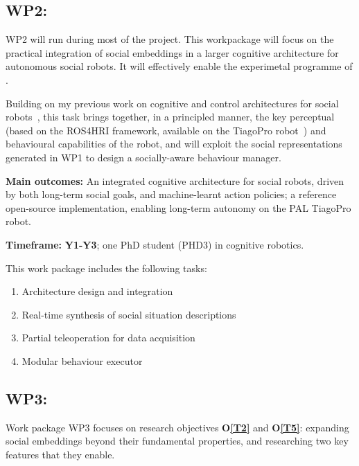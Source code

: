 \subsection{WP2: \textbf{\wpTwo}}

WP2 will run during most of the project. This workpackage will focus on the
practical integration of social embeddings in a larger cognitive architecture
for autonomous social robots. It will effectively enable the experimetal
programme of \project.

Building on my previous work on cognitive and control architectures for social
robots~\cite{lemaignan2017artificial,lemaignan2015pyrobots,baxter2016cognitive,lemaignan2014challenges,lemaignan2011what},
this task brings together, in a principled manner, the key perceptual (based on
the ROS4HRI framework, available on the TiagoPro robot~\cite{ros2023ros4hri})
and behavioural capabilities of the robot, and will exploit the social
representations generated in WP1 to design a socially-aware behaviour manager.


\begin{oframed}
    \textbf{Main outcomes:} An integrated cognitive architecture for social
    robots, driven by both long-term social goals, and machine-learnt action
    policies; a reference open-source implementation, enabling long-term
    autonomy on the PAL TiagoPro robot.

    \textbf{Timeframe:} \textbf{Y1-Y3}; one PhD student (PHD3) in cognitive
    robotics.

\end{oframed}

This work package includes the following tasks:

\begin{enumerate}[label=\textbf{T1.\arabic*}]
    \item{Architecture design and integration}
    \item{Real-time synthesis of social situation descriptions}
    \item{Partial teleoperation for data acquisition}
    \item{Modular behaviour executor}
\end{enumerate}

\subsection{WP3: \textbf{\wpThree}} 

Work package WP3 focuses on research objectives {\bf O\ref{T2}} and {\bf
O\ref{T5}}: expanding social embeddings beyond their fundamental properties, and
researching two key features that they enable.

